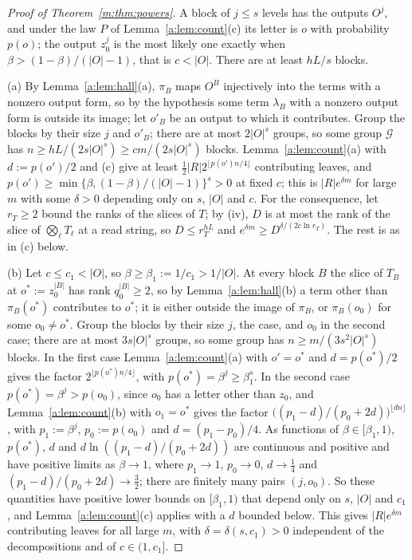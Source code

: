 \documentclass[11pt]{article}
\theoremstyle{definition}
\theoremstyle{remark}
\begin{document}
\begin{proof}[Proof of Theorem~\ref{m:thm:powers}]
A block of $j\le s$ levels has the outputs $O^j$, and under the law $P$ of Lemma~\ref{a:lem:count}(c) its letter is $o$ with probability $p(o)$; the output $z_0^j$ is the most likely one exactly when $\beta>(1-\beta)/(|O|-1)$, that is $c<|O|$. There are at least $hL/s$ blocks.

(a) By Lemma~\ref{a:lem:hall}(a), $\pi_B$ maps $O^B$ injectively into the terms with a nonzero output form, so by the hypothesis some term $\lambda_B$ with a nonzero output form is outside its image; let $o'_B$ be an output to which it contributes. Group the blocks by their size $j$ and $o'_B$; there are at most $2|O|^s$ groups, so some group $\mathcal G$ has $n\ge hL/(2s|O|^s)\ge cm/(2s|O|^s)$ blocks. Lemma~\ref{a:lem:count}(a) with $d:=p(o')/2$ and (c) give at least $\frac12|R|2^{\lfloor p(o')n/4\rfloor}$ contributing leaves, and $p(o')\ge\min\{\beta,(1-\beta)/(|O|-1)\}^s>0$ at fixed $c$; this is $|R|e^{\delta m}$ for large $m$ with some $\delta>0$ depending only on $s$, $|O|$ and $c$. For the consequence, let $r_T\ge2$ bound the ranks of the slices of $T$; by (iv), $D$ is at most the rank of the slice of $\bigotimes_\ell T_\ell$ at a read string, so $D\le r_T^{hL}$ and $e^{\delta m}\ge D^{\delta/(2c\ln r_T)}$. The rest is as in (c) below.

(b) Let $c\le c_1<|O|$, so $\beta\ge\beta_1:=1/c_1>1/|O|$. At every block $B$ the slice of $T_B$ at $o^*:=z_0^{|B|}$ has rank $q_0^{|B|}\ge2$, so by Lemma~\ref{a:lem:hall}(b) a term other than $\pi_B(o^*)$ contributes to $o^*$; it is either outside the image of $\pi_B$, or $\pi_B(o_0)$ for some $o_0\ne o^*$. Group the blocks by their size $j$, the case, and $o_0$ in the second case; there are at most $3s|O|^s$ groups, so some group has $n\ge m/(3s^2|O|^s)$ blocks. In the first case Lemma~\ref{a:lem:count}(a) with $o'=o^*$ and $d=p(o^*)/2$ gives the factor $2^{\lfloor p(o^*)n/4\rfloor}$, with $p(o^*)=\beta^j\ge\beta_1^s$. In the second case $p(o^*)=\beta^j>p(o_0)$, since $o_0$ has a letter other than $z_0$, and Lemma~\ref{a:lem:count}(b) with $o_1=o^*$ gives the factor $\big((p_1-d)/(p_0+2d)\big)^{\lfloor dn\rfloor}$, with $p_1:=\beta^j$, $p_0:=p(o_0)$ and $d=(p_1-p_0)/4$. As functions of $\beta\in[\beta_1,1)$, $p(o^*)$, $d$ and $d\ln((p_1-d)/(p_0+2d))$ are continuous and positive and have positive limits as $\beta\to1$, where $p_1\to1$, $p_0\to0$, $d\to\frac14$ and $(p_1-d)/(p_0+2d)\to\frac32$; there are finitely many pairs $(j,o_0)$. So these quantities have positive lower bounds on $[\beta_1,1)$ that depend only on $s$, $|O|$ and $c_1$, and Lemma~\ref{a:lem:count}(c) applies with a $d$ bounded below. This gives $|R|e^{\delta m}$ contributing leaves for all large $m$, with $\delta=\delta(s,c_1)>0$ independent of the decompositions and of $c\in(1,c_1]$.


\end{proof}
\end{document}

